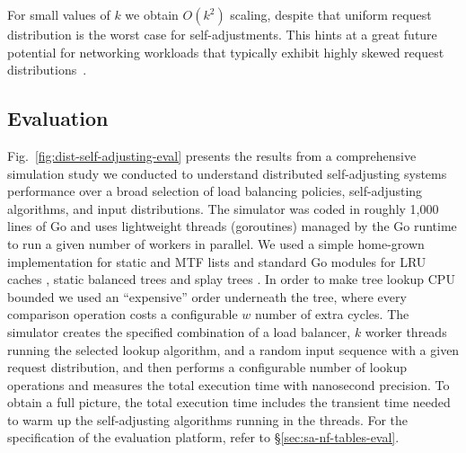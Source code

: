 For small values of $k$ we obtain $O(k^2)$ scaling, despite that uniform request distribution is the worst case for self-adjustments. This hints at a great future potential for networking workloads that typically exhibit highly skewed request distributions~\cite{832484}.

\subsection{Evaluation}
\label{sec:sims}

Fig.~\ref{fig:dist-self-adjusting-eval} presents the results from a comprehensive simulation study we conducted to understand distributed self-adjusting systems performance over a broad selection of load balancing policies, self-adjusting algorithms, and input distributions. The simulator was coded in roughly 1,000 lines of Go and uses lightweight threads (goroutines) managed by the Go runtime to run a given number of workers in parallel. We used a simple home-grown implementation for static and MTF lists and standard Go modules for LRU caches \cite{golang-lru}, static balanced trees \cite{golang-btree} and splay trees \cite{golang-splay}. In order to make tree lookup CPU bounded we used an ``expensive'' order underneath the tree, where every comparison operation costs a configurable $w$ number of extra cycles. The simulator creates the specified combination of a load balancer, $k$ worker threads running the selected lookup algorithm, and a random input sequence with a given request distribution, and then performs a configurable number of lookup operations and measures the total execution time with nanosecond precision. To obtain a full picture, the total execution time includes the transient time needed to warm up the self-adjusting algorithms running in the threads. For the specification of the evaluation platform, refer to \S\ref{sec:sa-nf-tables-eval}.

